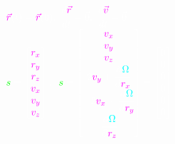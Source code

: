 \documentclass{article}
\begin{document}
$\color{white}
\color{mag}\vec{r}\color{white}(t)=\color{mag}\vec{r}\color{white}(0),\;
\cfrac{d\color{mag}\vec{r}\color{white}}{dt}=\vec{0},\;
\cfrac{d\color{mag}\vec{v}\color{white}}{dt}=\vec{0}
$\\

$
\color{white}\underline{\color{green}s\color{white}}=
\begin{bmatrix}
	 \color{mag}r_x \\
	 \color{mag}r_y \\
	 \color{mag}r_z \\
	 \color{mag}v_x \\
	 \color{mag}v_y \\
	 \color{mag}v_z
\end{bmatrix}
,\;\;
\color{white}\dot{\underline{\color{green}s\color{white}}}=
\begin{bmatrix}
	 \color{mag}v_x \\
	 \color{mag}v_y \\
	 \color{mag}v_z \\
	 \color{white}2\color{mag}v_y\color{white}+\cfrac{\partial\color{cyan}\Omega}{\partial \color{mag}r_x} \\
	 \color{white}-2\color{mag}v_x\color{white}+\cfrac{\partial\color{cyan}\Omega}{\partial \color{mag}r_y} \\
	 \color{white}\cfrac{\partial\color{cyan}\Omega}{\partial \color{mag}r_z}
\end{bmatrix}=
\begin{bmatrix}
	0 \\ 0 \\ 0 \\ 0 \\ 0 \\ 0
\end{bmatrix}
$\\\\


\end{document}
